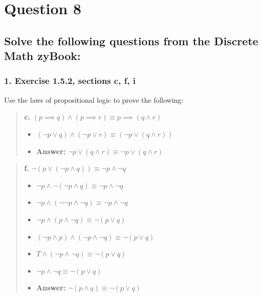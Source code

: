 \documentclass[11pt, oneside]{article}
\begin{document}
\pagebreak

\section*{Question 8}

\subsection*{Solve the following questions from the Discrete Math zyBook:}

\subsubsection*{1. Exercise 1.5.2, sections c, f, i}

Use the laws of propositional logic to prove the following:

\begin{quote}
    \textbf{c. }$(p \implies q) \land (p \implies r) \equiv p \implies (q \land r)$

    \begin{itemize}
        \item $(\neg p \lor q) \land (\neg p \lor r) \equiv (\neg p \lor (q \land r))$
        \item \textbf{Answer:} $\neg p \lor (q \land r) \equiv \neg p \lor (q \land r)$
    \end{itemize}
\end{quote}

\begin{quote}
    \textbf{f. }$\neg (p \lor (\neg p \land q)) \equiv \neg p \land \neg q$

    \begin{itemize}
        \item $\neg p \land \neg (\neg p \land q) \equiv \neg p \land \neg q$
        \item $\neg p \land (\neg \neg p \land \neg q) \equiv \neg p \land \neg q$
        \item $\neg p \land (p \land \neg q) \equiv \neg (p \lor q)$
        \item $(\neg p \land p) \land (\neg p \land \neg q) \equiv \neg (p \lor q)$
        \item $T \land (\neg p \land \neg q) \equiv \neg (p \lor q)$
        \item $\neg p \land \neg q \equiv \neg (p \lor q)$
        \item \textbf{Answer:} $\neg (p \land q) \equiv \neg (p \lor q)$
    \end{itemize}
\end{quote}
\end{document}
